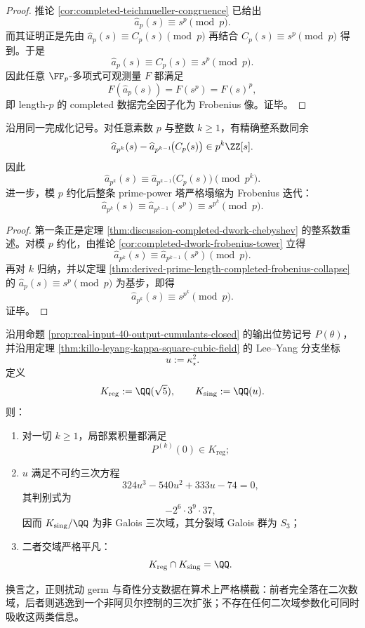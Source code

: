 \begin{proof}
推论 \ref{cor:completed-teichmueller-congruence} 已给出
\[
\widehat a_p(s)\equiv s^p \pmod p.
\]
而其证明正是先由
\(
\widehat a_p(s)\equiv C_p(s)\pmod p
\)
再结合
\(
C_p(s)\equiv s^p\pmod p
\)
得到。于是
\[
\widehat a_p(s)\equiv C_p(s)\equiv s^p\pmod p.
\]
因此任意 \(\FF_p\)-多项式可观测量 \(F\) 都满足
\[
F(\widehat a_p(s))=F(s^p)=F(s)^p,
\]
即 length-\(p\) 的 completed 数据完全因子化为 Frobenius 像。证毕。
\end{proof}

\begin{theorem}\label{thm:derived-prime-power-dwork-frobenius-tower}
沿用同一完成化记号。对任意素数 \(p\) 与整数 \(k\ge 1\)，有精确整系数同余
\[
\widehat a_{p^k}(s)-\widehat a_{p^{k-1}}\!\bigl(C_p(s)\bigr)\in p^k\ZZ[s].
\]
因此
\[
\widehat a_{p^k}(s)\equiv \widehat a_{p^{k-1}}\!\bigl(C_p(s)\bigr)\pmod{p^k}.
\]
进一步，模 \(p\) 约化后整条 prime-power 塔严格塌缩为 Frobenius 迭代：
\[
\widehat a_{p^k}(s)\equiv \widehat a_{p^{k-1}}(s^p)\equiv s^{p^k}\pmod p.
\]
\end{theorem}

\begin{proof}
第一条正是定理 \ref{thm:discussion-completed-dwork-chebyshev} 的整系数重述。对模 \(p\) 约化，由推论 \ref{cor:completed-dwork-frobenius-tower} 立得
\[
\widehat a_{p^k}(s)\equiv \widehat a_{p^{k-1}}(s^p)\pmod p.
\]
再对 \(k\) 归纳，并以定理 \ref{thm:derived-prime-length-completed-frobenius-collapse} 的
\(
\widehat a_p(s)\equiv s^p\pmod p
\)
为基步，即得
\[
\widehat a_{p^k}(s)\equiv s^{p^k}\pmod p.
\]
证毕。
\end{proof}

\begin{theorem}\label{thm:derived-regular-singular-arithmetic-splitting}
沿用命题 \ref{prop:real-input-40-output-cumulants-closed} 的输出位势记号 \(P(\theta)\)，并沿用定理 \ref{thm:killo-leyang-kappa-square-cubic-field} 的 Lee--Yang 分支坐标
\[
u:=\kappa_\star^2.
\]
定义
\[
K_{\mathrm{reg}}:=\QQ(\sqrt5),
\qquad
K_{\mathrm{sing}}:=\QQ(u).
\]
则：
\begin{enumerate}
  \item 对一切 \(k\ge 1\)，局部累积量都满足
  \[
  P^{(k)}(0)\in K_{\mathrm{reg}};
  \]
  \item \(u\) 满足不可约三次方程
  \[
  324u^3-540u^2+333u-74=0,
  \]
  其判别式为
  \[
  -2^6\cdot 3^9\cdot 37,
  \]
  因而 \(K_{\mathrm{sing}}/\QQ\) 为非 Galois 三次域，其分裂域 Galois 群为 \(S_3\)；
  \item 二者交域严格平凡：
  \[
  K_{\mathrm{reg}}\cap K_{\mathrm{sing}}=\QQ.
  \]
\end{enumerate}
换言之，正则扰动 germ 与奇性分支数据在算术上严格横截：前者完全落在二次数域，后者则逃逸到一个非阿贝尔控制的三次扩张；不存在任何二次域参数化可同时吸收这两类信息。
\end{theorem}

